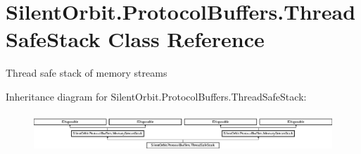 \hypertarget{class_silent_orbit_1_1_protocol_buffers_1_1_thread_safe_stack}{}\section{Silent\+Orbit.\+Protocol\+Buffers.\+Thread\+Safe\+Stack Class Reference}
\label{class_silent_orbit_1_1_protocol_buffers_1_1_thread_safe_stack}


Thread safe stack of memory streams  


Inheritance diagram for Silent\+Orbit.\+Protocol\+Buffers.\+Thread\+Safe\+Stack\+:\begin{figure}[H]
\begin{center}
\leavevmode
\includegraphics[height=1.443299cm]{class_silent_orbit_1_1_protocol_buffers_1_1_thread_safe_stack}
\end{center}
\end{figure}
